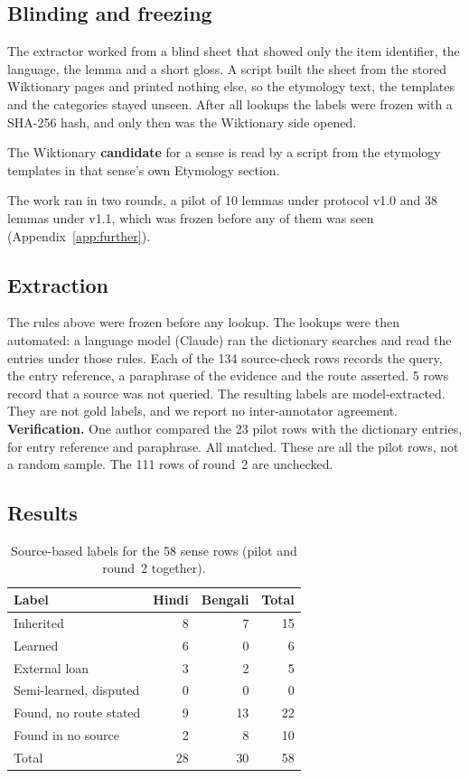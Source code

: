\documentclass[11pt]{article}
\begin{document}
\subsection{Blinding and freezing}

The extractor worked from a blind sheet that showed only the item identifier, the language, the lemma and a short gloss. A script built the sheet from the stored Wiktionary pages and printed nothing else, so the etymology text, the templates and the categories stayed unseen. After all lookups the labels were frozen with a SHA-256 hash, and only then was the Wiktionary side opened.

The Wiktionary \textbf{candidate} for a sense is read by a script from the etymology templates in that sense's own Etymology section.

The work ran in two rounds, a pilot of 10 lemmas under protocol v1.0 and 38 lemmas under v1.1, which was frozen before any of them was seen (Appendix~\ref{app:further}).

\subsection{Extraction}
\label{sec:extraction}

The rules above were frozen before any lookup. The lookups were then automated: a language model (Claude) ran the dictionary searches and read the entries under those rules. Each of the 134 source-check rows records the query, the entry reference, a paraphrase of the evidence and the route asserted. 5 rows record that a source was not queried. The resulting labels are model-extracted. They are not gold labels, and we report no inter-annotator agreement. \textbf{Verification.} One author compared the 23 pilot rows with the dictionary entries, for entry reference and paraphrase. All matched. These are all the pilot rows, not a random sample. The 111 rows of round~2 are unchecked.

\subsection{Results}

\begin{table}[h]
\centering\small
\begin{tabular}{lrrr}
\toprule
\textbf{Label} & \textbf{Hindi} & \textbf{Bengali} & \textbf{Total} \\
\midrule
Inherited & 8 & 7 & 15 \\
Learned & 6 & 0 & 6 \\
External loan & 3 & 2 & 5 \\
Semi-learned, disputed & 0 & 0 & 0 \\
\midrule
Found, no route stated & 9 & 13 & 22 \\
Found in no source & 2 & 8 & 10 \\
\midrule
Total & 28 & 30 & 58 \\
\bottomrule
\end{tabular}
\caption{Source-based labels for the 58 sense rows (pilot and round~2 together).}
\label{tab:labels}
\end{table}
\end{document}
